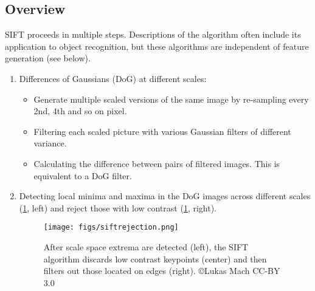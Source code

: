 \subsection{Overview}
SIFT proceeds in multiple steps. Descriptions of the algorithm often include its application to object recognition, but these algorithms are independent of feature generation (see below).

\begin{enumerate}
\item Differences of Gaussians (DoG) at different scales:
\begin{itemize}
\item Generate multiple scaled versions of the same image by re-sampling every 2nd, 4th and so on pixel.
\item Filtering each scaled picture with various Gaussian filters of different variance.
\item Calculating the difference between pairs of filtered images. This is equivalent to a DoG filter.
\end{itemize}

\item Detecting local minima and maxima in the DoG images across different scales (\cref{fig:siftrejection}, left) and reject those with low contrast (\cref{fig:siftrejection}, right).

\begin{figure}
	\centering
	\texttt{[image: figs/siftrejection.png]}
	\caption{After scale space extrema are detected (left), the SIFT algorithm discards low contrast keypoints (center) and then filters out those located on edges (right). \copyright Lukas Mach CC-BY 3.0}
	\label{fig:siftrejection}
\end{figure}


\end{enumerate}
